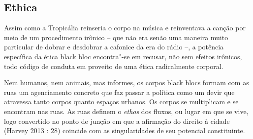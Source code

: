 \subsection{Ethica}

Assim como a Tropicália reinseria o corpo na música e
reinventava a canção por meio de um procedimento irônico -- que não era
senão uma maneira muito particular de dobrar e desdobrar a cafonice da
era do rádio --, a potência específica da ética black bloc encontra"-se
em recusar, não sem efeitos irônicos, todo código de conduta em proveito
de uma ética radicalmente corporal.

Nem humanos, nem animais, mas informes, os corpos black blocs formam com
as ruas um agenciamento concreto que faz passar a política como um devir
que atravessa tanto corpos quanto espaços urbanos. Os corpos se
multiplicam e se encontram nas ruas. As ruas definem o \emph{ethos }dos
fluxos, ou lugar em que se vive, logo convertido no ponto de junção em
que a afirmação do direito à cidade (Harvey 2013 : 28) coincide com as
singularidades de seu potencial constituinte.

